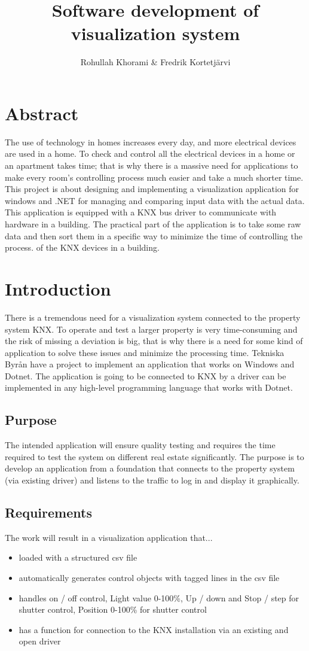 \documentclass{article}
\title{Software development of visualization system}
\author{Rohullah Khorami \& Fredrik Kortetjärvi}
\begin{document}
\maketitle
\newpage
\tableofcontents
\newpage
\section{Abstract}
The use of technology in homes increases every day, and more electrical devices are used in a home. To check and control all the electrical devices in a home or an apartment takes time; that is why there is a massive need for applications to make every room's controlling process much easier and take a much shorter time. This project is about designing and implementing a visualization application for windows and .NET for managing and comparing input data with the actual data. This application is equipped with a KNX bus driver to communicate with hardware in a building. The practical part of the application is to take some raw data and then sort them in a specific way to minimize the time of controlling the process. of the KNX devices in a building.
\section{Introduction}
There is a tremendous need for a visualization system connected to the property system KNX. To operate and test a larger property is very time-consuming and the risk of missing a deviation is big, that is why there is a need for some kind of application to solve these issues and minimize the processing time. Tekniska Byrån have a project to implement an application that works on Windows and Dotnet. The application is going to be connected to KNX by a driver can be implemented in any high-level programming language that works with Dotnet.
\subsection{Purpose}
The intended application will ensure quality testing and requires the time required to test the system on different real estate significantly. The purpose is to develop an application from a foundation that connects to the property system (via existing driver) and listens to the traffic to log in and display it graphically.
\subsection{Requirements}
The work will result in a visualization application that...
\begin{itemize}
    \item loaded with a structured csv file
    \item automatically generates control objects with tagged lines in the csv file
    \item handles on / off control, Light value 0-100\%, Up / down and Stop / step for shutter control, Position 0-100\% for shutter control
    \item has a function for connection to the KNX installation via an existing and open driver
\end{itemize}
\end{document}
